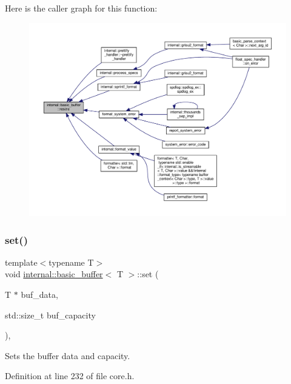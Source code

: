 Here is the caller graph for this function\+:
\nopagebreak
\begin{figure}[H]
\begin{center}
\leavevmode
\includegraphics[width=350pt]{classinternal_1_1basic__buffer_adbd2b147e114f0cc4573f734d4326669_icgraph}
\end{center}
\end{figure}
\mbox{\label{classinternal_1_1basic__buffer_a0b603108f1aa614e64efaac6e081086d}} 
\subsubsection{\texorpdfstring{set()}{set()}}
{\footnotesize\ttfamily template$<$typename T$>$ \\
void \hyperlink{classinternal_1_1basic__buffer}{internal\+::basic\+\_\+buffer}$<$ T $>$\+::set (\begin{DoxyParamCaption}\item[{T $\ast$}]{buf\+\_\+data,  }\item[{std\+::size\+\_\+t}]{buf\+\_\+capacity }\end{DoxyParamCaption})\hspace{0.3cm}{\ttfamily [inline]}, {\ttfamily [protected]}}

Sets the buffer data and capacity. 

Definition at line 232 of file core.\+h.

